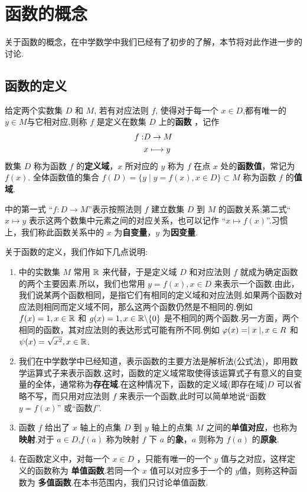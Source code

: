 \section{函数的概念}

关于函数的概念，在中学数学中我们已经有了初步的了解，本节将对此作进一步的讨论.

\subsection{函数的定义}

\begin{definition}[函数]\label{def:fx}
    给定两个实数集 $D$ 和 $M$, 若有对应法则 $f$, 使得对于每一个 $x\in D$,都有唯一的 $y\in M$与它相对应,则称 $f$ 是定义在数集 $D$ 上的\textbf{函数} ，记作    
    \begin{align} \label{eq:fx}
        f  :&D \to M\notag \\ 
        &x  \longmapsto y
    \end{align}
    数集 $D$ 称为函数 $f$ 的\textbf{定义域}，$x$ 所对应的 $y$ 称为 $f$ 在点 $x$ 处的\textbf{函数值}，常记为 $f(x)$. 全体函数值的集合 $f(D)=\{ y \mid y=f(x),x \in D\}\subset M$ 称为函数 $f$ 的\textbf{值域}.
\end{definition}

 中的第一式 “$f:D\to M$”表示按照法则 $f$ 建立数集 $D$ 到 $M$ 的函数关系;第二式“$x\longmapsto y$ 表示这两个数集中元素之间的对应关系，也可以记作 “$x\longmapsto f(x)$”.习惯上，我们称此函数关系中的 $x$ 为\textbf{自变量}，$y$ 为\textbf{因变量}.

关于函数的定义，我们作如下几点说明:

\begin{enumerate}
    \item {}中的实数集 $M$ 常用 $\mathbb{R}$ 来代替，于是定义域 $D$ 和对应法则 $f$ 就成为确定函数的两个主要因素.所以，我们也常用 $y=f(x),x\in D$ 来表示一个函数.由此，我们说某两个函数相同，是指它们有相同的定义域和对应法则.如果两个函数对应法则相同而定义域不同，那么这两个函数仍然是不相同的.例如 $f(x)=1,x\in \mathbb{R}$ 和 $g(x)=1,x\in \mathbb{R}\backslash\{0\}$ 是不相同的两个函数.另一方面，两个相同的函数，其对应法则的表达形式可能有所不同.例如 $\varphi(x)=\mid x \mid,x\in R$ 和 $\psi (x)=\sqrt{x^2},x\in \mathbb{R}$.
    \item 我们在中学数学中已经知道，表示函数的主要方法是解析法(公式法)，即用数学运算式子来表示函数.这时，函数的定义域常取使得该运算式子有意义的自变量的全体，通常称为\textbf{存在域}.在这种情况下，函数的定义域(即存在域)$D$ 可以省略不写，而只用对应法则 $f$ 来表示一个函数,此时可以简单地说“函数 $y=f(x)$” 或“函数$f$”.
    \item 函数 $f$ 给出了 $x$ 轴上的点集 $D$ 到 $y$ 轴上的点集 $M$ 之间的\textbf{单值对应}，也称为\textbf{映射}.对于 $a\in D$,$f(a)$ 称为映射 $f$ 下 $a$ 的\textbf{象}，$a$ 则称为 $f(a)$ 的\textbf{原象}.
    \item 在函数定义中，对每一个 $x\in D$ ，只能有唯一的一个 $y$ 值与之对应，这样定义的函数称为 \textbf{单值函数}.若同一个 $x$ 值可以对应多于一个的 $y$值，则称这种函数为 \textbf{多值函数}.在本书范围内，我们只讨论单值函数.
\end{enumerate}

